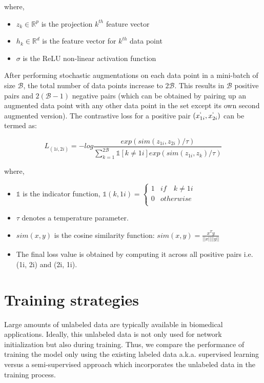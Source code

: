 where,
\begin{itemize}[label={}]
  \setlength\itemsep{0em}
  \item $z_k \in \mathbb{R}^{p}$ is the projection $k^{th}$ feature vector
  \item $h_k \in \mathbb{R}^{d}$ is the feature vector for $k^{th}$ data point
  \item $\sigma$ is the ReLU\cite{nwankpa2018} non-linear activation function
\end{itemize}
After performing stochastic augmentations on each data point in a mini-batch of size $\mathcal{B}$, the total number of data points increase to $2\mathcal{B}$. This results in $\mathcal{B}$ positive pairs and $2(\mathcal{B}-1)$ negative pairs (which can be obtained by pairing up an augmented data point with any other data point in the set except its own second augmented version). The contrastive loss for a positive pair $(x_{1i}^{`}, x_{2i}^{`})$ can be termed as:

\begin{equation}
    \label{equation:simclr_contrastive_loss}
    L_{(1i, 2i)} = -log \frac{exp(sim(z_{1i}, z_{2i}) / \tau)}{\sum_{k=1}^{2\mathcal{B}} \mathbb{1}[k\neq 1i] exp(sim(z_{1i}, z_{k}) / \tau)}
\end{equation}

where,
\begin{itemize}[label={}]
  \setlength\itemsep{0em}
  \item $\mathbb{1}$ is the indicator function, $\mathbb{1}(k, 1i) = \begin{cases} 
      1 & if \quad k \neq 1i \\
      0 & otherwise \\
   \end{cases}$ 
   \item $\tau$ denotes a temperature parameter. 
   \item $sim(x, y)$ is the cosine similarity function: $sim(x, y) = \frac{x^{T}y}{||x||||y||}$
   \item The final loss value is obtained by computing it across all positive pairs i.e. (1i, 2i) and (2i, 1i).
\end{itemize}

\section{Training strategies}\label{section:training_strategies}
Large amounts of unlabeled data are typically available in biomedical applications. Ideally, this unlabeled data is not only used for network initialization but also during training. Thus, we compare the performance of training the model only using the existing labeled data a.k.a. supervised learning versus a semi-supervised approach which incorporates the unlabeled data in the training process.

